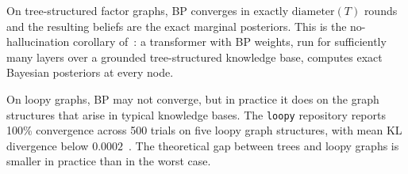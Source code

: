 On tree-structured factor graphs, BP converges in exactly $\mathrm{diameter}(T)$
rounds and the resulting beliefs are the exact marginal posteriors. This is the
no-hallucination corollary of~\cite{coppola2026transformers}: a transformer with BP
weights, run for sufficiently many layers over a grounded tree-structured knowledge
base, computes exact Bayesian posteriors at every node.

On loopy graphs, BP may not converge, but in practice it does on the graph structures
that arise in typical knowledge bases. The \texttt{loopy} repository reports 100\%
convergence across 500 trials on five loopy graph structures, with mean KL divergence
below $0.0002$~\cite{coppola2026transformers}. The theoretical gap between trees and
loopy graphs is smaller in practice than in the worst case.